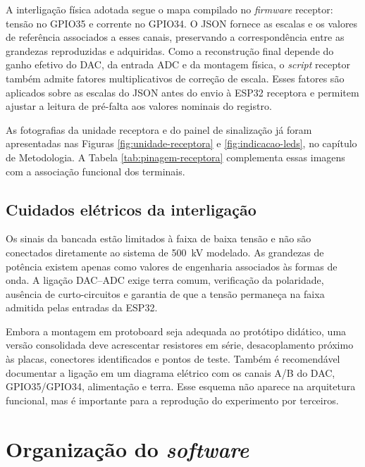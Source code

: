 A interligação física adotada segue o mapa compilado no \textit{firmware} receptor: tensão no GPIO35 e corrente no GPIO34. O JSON fornece as escalas e os valores de referência associados a esses canais, preservando a correspondência entre as grandezas reproduzidas e adquiridas. Como a reconstrução final depende do ganho efetivo do DAC, da entrada ADC e da montagem física, o \textit{script} receptor também admite fatores multiplicativos de correção de escala. Esses fatores são aplicados sobre as escalas do JSON antes do envio à ESP32 receptora e permitem ajustar a leitura de pré-falta aos valores nominais do registro.

As fotografias da unidade receptora e do painel de sinalização já foram apresentadas nas Figuras \ref{fig:unidade-receptora} e \ref{fig:indicacao-leds}, no capítulo de Metodologia. A Tabela \ref{tab:pinagem-receptora} complementa essas imagens com a associação funcional dos terminais.

\subsection{Cuidados elétricos da interligação}

Os sinais da bancada estão limitados à faixa de baixa tensão e não são conectados diretamente ao sistema de \SI{500}{\kilo\volt} modelado. As grandezas de potência existem apenas como valores de engenharia associados às formas de onda. A ligação DAC--ADC exige terra comum, verificação da polaridade, ausência de curto-circuitos e garantia de que a tensão permaneça na faixa admitida pelas entradas da ESP32.

Embora a montagem em protoboard seja adequada ao protótipo didático, uma versão consolidada deve acrescentar resistores em série, desacoplamento próximo às placas, conectores identificados e pontos de teste. Também é recomendável documentar a ligação em um diagrama elétrico com os canais A/B do DAC, GPIO35/GPIO34, alimentação e terra. Esse esquema não aparece na arquitetura funcional, mas é importante para a reprodução do experimento por terceiros.

\section{Organização do \textit{software}}
\label{sec:organizacao-software}

